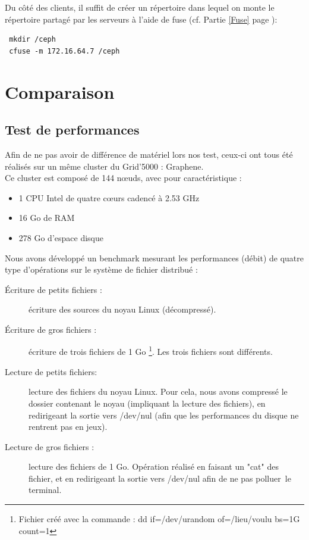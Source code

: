\documentclass[12pt]{report}
\begin{document}
                        Du côté des clients, il suffit de créer un répertoire dans lequel on monte le répertoire partagé par les serveurs à l'aide de fuse (cf. Partie \ref{Fuse} page \pageref{Fuse}):
                        \begin{lstlisting}
 mkdir /ceph
 cfuse -m 172.16.64.7 /ceph
                        \end{lstlisting}
	\chapter{Comparaison}
		\section{Test de performances}
			Afin de ne pas avoir de différence de matériel lors nos test, ceux-ci ont tous été réalisés sur un même cluster du Grid'5000 : Graphene.\\

			Ce cluster est composé de 144 nœuds, avec pour caractéristique :
			\begin{itemize}
				\item 1 CPU Intel de quatre cœurs cadencé à 2.53 GHz
				\item 16 Go de RAM
				\item 278 Go d'espace disque\\
			\end{itemize}

			Nous avons développé un benchmark mesurant les performances (débit) de quatre type d'opérations sur le système de fichier distribué :
			\begin{description}
				\item[Écriture de petits fichiers :] écriture des sources du noyau Linux (décompressé).
				\item[Écriture de gros fichiers :] écriture de trois fichiers de 1 Go
				\footnote{Fichier créé avec la commande : dd if=/dev/urandom of=/lieu/voulu bs=1G count=1}. Les trois fichiers sont différents.
				\item[Lecture de petits fichiers: ] lecture des fichiers du noyau Linux.
				Pour cela, nous avons compressé le dossier contenant le noyau (impliquant la lecture des fichiers),
				en redirigeant la sortie vers /dev/nul (afin que les performances du disque ne rentrent pas en jeux).
				\item[Lecture de gros fichiers :] lecture des fichiers de 1 Go. Opération réalisé en faisant un "cat" des fichier,
				et en redirigeant la sortie vers /dev/nul afin de ne pas \og polluer\fg~le terminal.\\
			\end{description}
\end{document}
